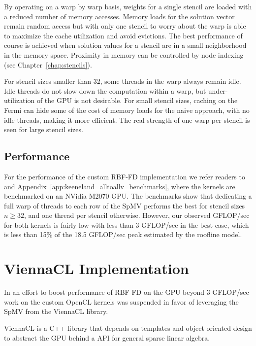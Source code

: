 \documentclass{report}
\begin{document}
By operating on a warp by warp basis, weights for a single stencil are loaded with a reduced number of memory accesses. Memory loads for the solution vector remain random access but with only one stencil to worry about the warp is able to maximize the cache utilization and avoid evictions. The best performance of course is achieved when solution values for a stencil are in a small neighborhood in the memory space. Proximity in memory can be controlled by node indexing (see Chapter~\ref{chap:stencils}). 

For stencil sizes smaller than 32, some threads in the warp always remain idle. Idle threads do not slow down the computation within a warp, but under-utilization of the GPU is not desirable. For small stencil sizes, caching on the Fermi can hide some of the cost of memory loads for the naive approach, with no idle threads, making it more efficient. The real strength of one warp per stencil is seen for large stencil sizes. 

\subsection{Performance}

For the performance of the custom RBF-FD implementation we refer readers to \cite{BolligFlyerErlebacher2012} and Appendix~\ref{app:keeneland_alltoallv_benchmarks}, where the kernels are benchmarked on an NVidia M2070 GPU. The benchmarks show that dedicating a full warp of threads to each row of the SpMV performs the best for stencil sizes $n \geq 32$, and one thread per stencil otherwise. However, our observed GFLOP/sec for both kernels is fairly low with less than 3 GFLOP/sec in the best case, which is less than 15\% of the 18.5 GFLOP/sec peak estimated by the roofline model. 



\section{ViennaCL Implementation} 

In an effort to boost performance of RBF-FD on the GPU beyond 3 GFLOP/sec work on the custom OpenCL kernels was suspended in favor of leveraging the SpMV from the ViennaCL library. 

ViennaCL is a C++ library that depends on templates and object-oriented design to abstract the GPU behind a API for general sparse linear algebra. 
\end{document}
